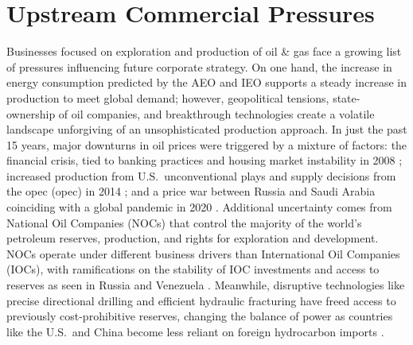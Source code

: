 \section{Upstream Commercial Pressures}\label{ch1:upstream}
Businesses focused on exploration and production of oil \& gas face a growing list of pressures influencing future corporate strategy. On one hand, the increase in energy consumption predicted by the AEO and IEO supports a steady increase in production to meet global demand; however, geopolitical tensions, state-ownership of oil companies, and breakthrough technologies create a volatile landscape unforgiving of an unsophisticated production approach. In just the past 15 years, major downturns in oil prices were triggered by a mixture of factors: the financial crisis, tied to banking practices and housing market instability in 2008 \citep{singh_2007-2008_2021}; increased production from U.S.\ unconventional plays and supply decisions from the \acrlong{opec} (\acrshort{opec}) in 2014 \citep{lioudis_what_2021}; and a price war between Russia and Saudi Arabia coinciding with a global pandemic in 2020 \citep{blessing_what_2021}. Additional uncertainty comes from National Oil Companies (NOCs) that control the majority of the world’s petroleum reserves, production, and rights for exploration and development. NOCs operate under different business drivers than International Oil Companies (IOCs), with ramifications on the stability of IOC investments and access to reserves as seen in Russia and Venezuela  \citep{bremmer_long_2010,pirog_role_2007}. Meanwhile, disruptive technologies like precise directional drilling and efficient hydraulic fracturing have freed access to previously cost-prohibitive reserves, changing the balance of power as countries like the U.S.\ and China become less reliant on foreign hydrocarbon imports \citep{shuen_dynamic_2014}.

